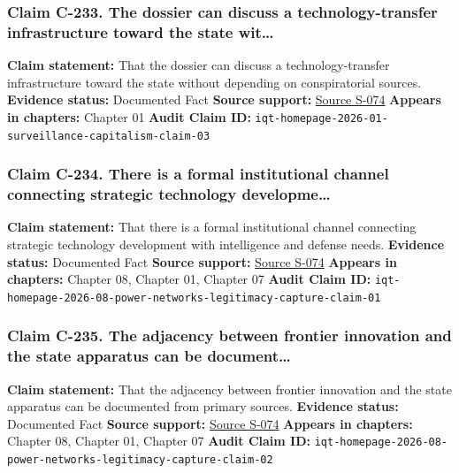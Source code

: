 \documentclass[
  american,
  11pt,
  letterpaper,
]{article}
\begin{document}
\subsubsection{Claim C-233. The dossier can discuss a
technology-transfer infrastructure toward the state
wit\ldots{}}\label{claim-c-233-the-dossier-can-discuss-a-technology-transfer-infrastructure-toward-the-state-wit}

\textbf{Claim statement:} That the dossier can discuss a
technology-transfer infrastructure toward the state without depending on
conspiratorial sources. \textbf{Evidence status:} Documented Fact
\textbf{Source support:} \hyperref[source-s-074-in-q-tel]{Source S-074}
\textbf{Appears in chapters:} Chapter 01 \textbf{Audit Claim ID:}
\texttt{iqt-homepage-2026-01-surveillance-capitalism-claim-03}

\subsubsection{Claim C-234. There is a formal institutional channel
connecting strategic technology
developme\ldots{}}\label{claim-c-234-there-is-a-formal-institutional-channel-connecting-strategic-technology-developme}

\textbf{Claim statement:} That there is a formal institutional channel
connecting strategic technology development with intelligence and
defense needs. \textbf{Evidence status:} Documented Fact \textbf{Source
support:} \hyperref[source-s-074-in-q-tel]{Source S-074} \textbf{Appears
in chapters:} Chapter 08, Chapter 01, Chapter 07 \textbf{Audit Claim
ID:}
\texttt{iqt-homepage-2026-08-power-networks-legitimacy-capture-claim-01}

\subsubsection{Claim C-235. The adjacency between frontier innovation
and the state apparatus can be
document\ldots{}}\label{claim-c-235-the-adjacency-between-frontier-innovation-and-the-state-apparatus-can-be-document}

\textbf{Claim statement:} That the adjacency between frontier innovation
and the state apparatus can be documented from primary sources.
\textbf{Evidence status:} Documented Fact \textbf{Source support:}
\hyperref[source-s-074-in-q-tel]{Source S-074} \textbf{Appears in
chapters:} Chapter 08, Chapter 01, Chapter 07 \textbf{Audit Claim ID:}
\texttt{iqt-homepage-2026-08-power-networks-legitimacy-capture-claim-02}
\end{document}
